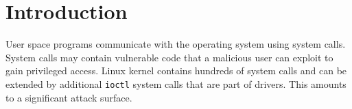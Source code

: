 \section{Introduction}









User space programs communicate with the operating system using system calls.
System calls may contain vulnerable code that a malicious user can exploit to
gain privileged access. Linux kernel contains hundreds of system calls and
can be extended by additional \texttt{ioctl} system calls that are part of
drivers. This amounts to a significant attack surface.

